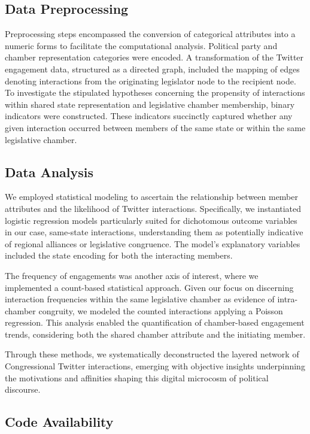\documentclass[11pt]{article}
\begin{document}
\subsection*{Data Preprocessing}

Preprocessing steps encompassed the conversion of categorical attributes into a numeric forms to facilitate the computational analysis. Political party and chamber representation categories were encoded. A transformation of the Twitter engagement data, structured as a directed graph, included the mapping of edges denoting interactions from the originating legislator node to the recipient node. To investigate the stipulated hypotheses concerning the propensity of interactions within shared state representation and legislative chamber membership, binary indicators were constructed. These indicators succinctly captured whether any given interaction occurred between members of the same state or within the same legislative chamber.

\subsection*{Data Analysis}

We employed statistical modeling to ascertain the relationship between member attributes and the likelihood of Twitter interactions. Specifically, we instantiated logistic regression models particularly suited for dichotomous outcome variables in our case, same-state interactions, understanding them as potentially indicative of regional alliances or legislative congruence. The model's explanatory variables included the state encoding for both the interacting members.

The frequency of engagements was another axis of interest, where we implemented a count-based statistical approach. Given our focus on discerning interaction frequencies within the same legislative chamber as evidence of intra-chamber congruity, we modeled the counted interactions applying a Poisson regression. This analysis enabled the quantification of chamber-based engagement trends, considering both the shared chamber attribute and the initiating member.

Through these methods, we systematically deconstructed the layered network of Congressional Twitter interactions, emerging with objective insights underpinning the motivations and affinities shaping this digital microcosm of political discourse.\subsection*{Code Availability}
\end{document}
